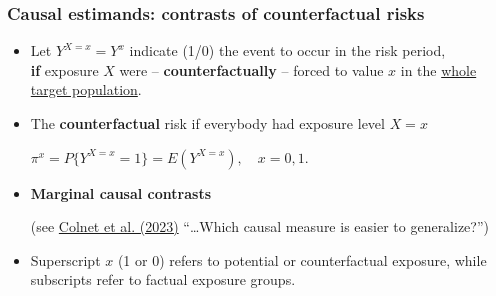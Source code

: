 \documentclass[12pt,dvipsnames,t,aspectratio=169, handout%
]{beamer}
\begin{document}
\begin{frame}
\frametitle{\large Causal estimands: contrasts of counterfactual risks}
\begin{itemize}
\item
Let $Y^{X=x} = Y^x$ %
indicate (1/0) the event to occur in the risk period, \\
\medskip
\textbf{if} exposure $X$ were 
-- \textbf{counterfactually} -- forced
to value $x$ in the \underline{whole target population}. 
\pause
\medskip
\item
The {\bf counterfactual} risk if everybody had exposure level $X=x$
\begin{center}
$  \pi^x = P \{ Y^{X=x} = 1 \} = E(Y^{X=x}), \quad x=0,1. $ %
\end{center}
\medskip
\item
{\bf Marginal causal contrasts} \\ %
\medskip
{}
\medskip
{\small (see \href{https://doi.org/10.48550/arXiv.2303.16008}{\color{blue}Colnet et al. (2023)}
``\dots Which causal measure is easier to generalize?'')}
\medskip
\item[NB.] Superscript $x$ (1 or 0) refers to 
potential or counterfactual exposure, while \\
subscripts refer to factual exposure groups. 

\end{itemize}  

\end{frame}
\end{document}
